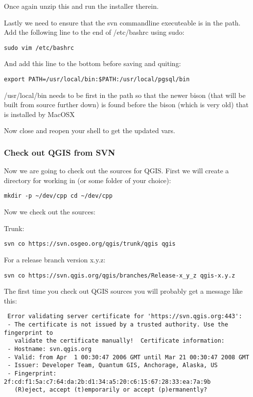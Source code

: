 Once again unzip this and run the installer therein.

Lastly we need to ensure that the svn commandline executeable is in the path.
Add the following line to the end of /etc/bashrc using sudo:

\begin{verbatim}
sudo vim /etc/bashrc 
\end{verbatim}

And add this line to the bottom before saving and quiting:

\begin{verbatim}
export PATH=/usr/local/bin:$PATH:/usr/local/pgsql/bin 
\end{verbatim}

/usr/local/bin needs to be first in the path so that the newer bison (that will
be built from source further down) is found before the bison (which is very
old) that is installed by MacOSX

Now close and reopen your shell to get the updated vars.

\hypertarget{toc23}{}
\subsubsection{Check out QGIS from SVN}
Now we are going to check out the sources for QGIS. First we will create a
directory for working in (or some folder of your choice):

\begin{verbatim}
mkdir -p ~/dev/cpp cd ~/dev/cpp 
\end{verbatim}

Now we check out the sources:

Trunk:

\begin{verbatim}
svn co https://svn.osgeo.org/qgis/trunk/qgis qgis 
\end{verbatim}

For a release branch version x.y.z:

\begin{verbatim}
svn co https://svn.qgis.org/qgis/branches/Release-x_y_z qgis-x.y.z
\end{verbatim}

The first time you check out QGIS sources you will probably get a message like
this:

\begin{verbatim}
 Error validating server certificate for 'https://svn.qgis.org:443':
 - The certificate is not issued by a trusted authority. Use the fingerprint to
   validate the certificate manually!  Certificate information:
 - Hostname: svn.qgis.org
 - Valid: from Apr  1 00:30:47 2006 GMT until Mar 21 00:30:47 2008 GMT
 - Issuer: Developer Team, Quantum GIS, Anchorage, Alaska, US
 - Fingerprint: 2f:cd:f1:5a:c7:64:da:2b:d1:34:a5:20:c6:15:67:28:33:ea:7a:9b
   (R)eject, accept (t)emporarily or accept (p)ermanently?  
\end{verbatim}

